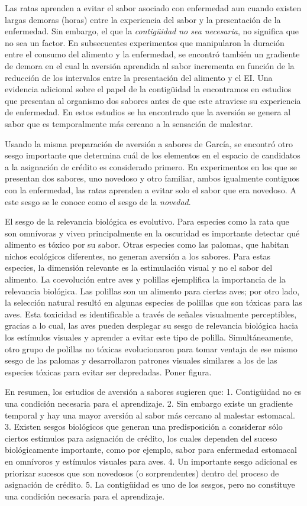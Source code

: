 \documentclass[
  letterpaper,
]{book}
\begin{document}
Las ratas aprenden a evitar el sabor asociado con enfermedad aun cuando
existen largas demoras (horas) entre la experiencia del sabor y la
presentación de la enfermedad. Sin embargo, el que la \emph{contigüidad
no sea necesaria}, no significa que no sea un factor. En subsecuentes
experimentos que manipularon la duración entre el consumo del alimento y
la enfermedad, se encontró también un gradiente de demora en el cual la
aversión aprendida al sabor incrementa en función de la reducción de los
intervalos entre la presentación del alimento y el EI. Una evidencia
adicional sobre el papel de la contigüidad la encontramos en estudios
que presentan al organismo dos sabores antes de que este atraviese su
experiencia de enfermedad. En estos estudios se ha encontrado que la
aversión se genera al sabor que es temporalmente más cercano a la
sensación de malestar.

Usando la misma preparación de aversión a sabores de García, se encontró
otro sesgo importante que determina cuál de los elementos en el espacio
de candidatos a la asignación de crédito es considerado primero. En
experimentos en los que se presentan dos sabores, uno novedoso y otro
familiar, ambos igualmente contiguos con la enfermedad, las ratas
aprenden a evitar solo el sabor que era novedoso. A este sesgo se le
conoce como el sesgo de la \emph{novedad}.

El sesgo de la relevancia biológica es evolutivo. Para especies como la
rata que son omnívoras y viven principalmente en la oscuridad es
importante detectar qué alimento es tóxico por su sabor. Otras especies
como las palomas, que habitan nichos ecológicos diferentes, no generan
aversión a los sabores. Para estas especies, la dimensión relevante es
la estimulación visual y no el sabor del alimento. La coevolución entre
aves y polillas ejemplifica la importancia de la relevancia biológica.
Las polillas son un alimento para ciertas aves; por otro lado, la
selección natural resultó en algunas especies de polillas que son
tóxicas para las aves. Esta toxicidad es identificable a través de
señales visualmente perceptibles, gracias a lo cual, las aves pueden
desplegar su sesgo de relevancia biológica hacia los estímulos visuales
y aprender a evitar este tipo de polilla. Simultáneamente, otro grupo de
polillas no tóxicas evolucionaron para tomar ventaja de ese mismo sesgo
de las palomas y desarrollaron patrones visuales similares a los de las
especies tóxicas para evitar ser depredadas. Poner figura.

En resumen, los estudios de aversión a sabores sugieren que: 1.
Contigüidad no es una condición necesaria para el aprendizaje. 2. Sin
embargo existe un gradiente temporal y hay una mayor aversión al sabor
más cercano al malestar estomacal. 3. Existen sesgos biológicos que
generan una predisposición a considerar sólo ciertos estímulos para
asignación de crédito, los cuales dependen del suceso biológicamente
importante, como por ejemplo, sabor para enfermedad estomacal en
omnívoros y estímulos visuales para aves. 4. Un importante sesgo
adicional es priorizar sucesos que son novedosos (o sorprendentes)
dentro del proceso de asignación de crédito. 5. La contigüidad es uno de
los sesgos, pero no constituye una condición necesaria para el
aprendizaje.
\end{document}

